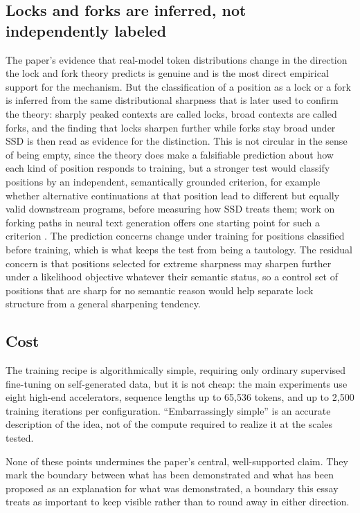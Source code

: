 \documentclass[11pt]{article}
\begin{document}
\subsection{Locks and forks are inferred, not independently labeled}

The paper's evidence that real-model token distributions change in the direction the lock and fork theory predicts is genuine and is the most direct empirical support for the mechanism. But the classification of a position as a lock or a fork is inferred from the same distributional sharpness that is later used to confirm the theory: sharply peaked contexts are called locks, broad contexts are called forks, and the finding that locks sharpen further while forks stay broad under SSD is then read as evidence for the distinction. This is not circular in the sense of being empty, since the theory does make a falsifiable prediction about how each kind of position responds to training, but a stronger test would classify positions by an independent, semantically grounded criterion, for example whether alternative continuations at that position lead to different but equally valid downstream programs, before measuring how SSD treats them; work on forking paths in neural text generation offers one starting point for such a criterion \cite{bigelow2025forking}. The prediction concerns change under training for positions classified before training, which is what keeps the test from being a tautology. The residual concern is that positions selected for extreme sharpness may sharpen further under a likelihood objective whatever their semantic status, so a control set of positions that are sharp for no semantic reason would help separate lock structure from a general sharpening tendency.

\subsection{Cost}

The training recipe is algorithmically simple, requiring only ordinary supervised fine-tuning on self-generated data, but it is not cheap: the main experiments use eight high-end accelerators, sequence lengths up to 65{,}536 tokens, and up to 2{,}500 training iterations per configuration. ``Embarrassingly simple'' is an accurate description of the idea, not of the compute required to realize it at the scales tested.

None of these points undermines the paper's central, well-supported claim. They mark the boundary between what has been demonstrated and what has been proposed as an explanation for what was demonstrated, a boundary this essay treats as important to keep visible rather than to round away in either direction.
\end{document}
